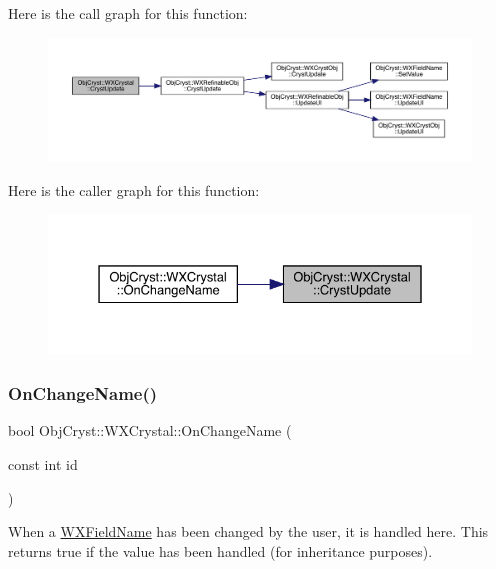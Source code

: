 Here is the call graph for this function\+:
\nopagebreak
\begin{figure}[H]
\begin{center}
\leavevmode
\includegraphics[width=350pt]{class_obj_cryst_1_1_w_x_crystal_a4b48719679bb8be44eb77a45ac28f4fb_cgraph}
\end{center}
\end{figure}
Here is the caller graph for this function\+:
\nopagebreak
\begin{figure}[H]
\begin{center}
\leavevmode
\includegraphics[width=331pt]{class_obj_cryst_1_1_w_x_crystal_a4b48719679bb8be44eb77a45ac28f4fb_icgraph}
\end{center}
\end{figure}
\mbox{\label{class_obj_cryst_1_1_w_x_crystal_a7a15c2d1b5f5997ace336724fc396892}} 
\subsubsection{\texorpdfstring{OnChangeName()}{OnChangeName()}}
{\footnotesize\ttfamily bool Obj\+Cryst\+::\+W\+X\+Crystal\+::\+On\+Change\+Name (\begin{DoxyParamCaption}\item[{const int}]{id }\end{DoxyParamCaption})\hspace{0.3cm}{\ttfamily [virtual]}}

When a \mbox{\hyperlink{class_obj_cryst_1_1_w_x_field_name}{W\+X\+Field\+Name}} has been changed by the user, it is handled here. This returns true if the value has been handled (for inheritance purposes). 

